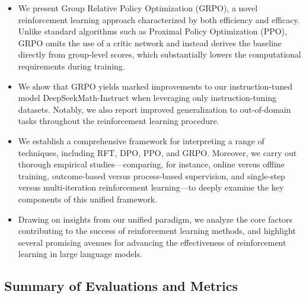 \begin{itemize}[topsep=0pt]
    \item We present Group Relative Policy Optimization (GRPO), a novel reinforcement learning approach characterized by both efficiency and efficacy. Unlike standard algorithms such as Proximal Policy Optimization (PPO), GRPO omits the use of a critic network and instead derives the baseline directly from group-level scores, which substantially lowers the computational requirements during training.
    \item We show that GRPO yields marked improvements to our instruction-tuned model DeepSeekMath-Instruct when leveraging only instruction-tuning datasets. Notably, we also report improved generalization to out-of-domain tasks throughout the reinforcement learning procedure.
    \item We establish a comprehensive framework for interpreting a range of techniques, including RFT, DPO, PPO, and GRPO. Moreover, we carry out thorough empirical studies—comparing, for instance, online versus offline training, outcome-based versus process-based supervision, and single-step versus multi-iteration reinforcement learning—to deeply examine the key components of this unified framework.
    \item Drawing on insights from our unified paradigm, we analyze the core factors contributing to the success of reinforcement learning methods, and highlight several promising avenues for advancing the effectiveness of reinforcement learning in large language models.
\end{itemize}

\subsection{Summary of Evaluations and Metrics}

